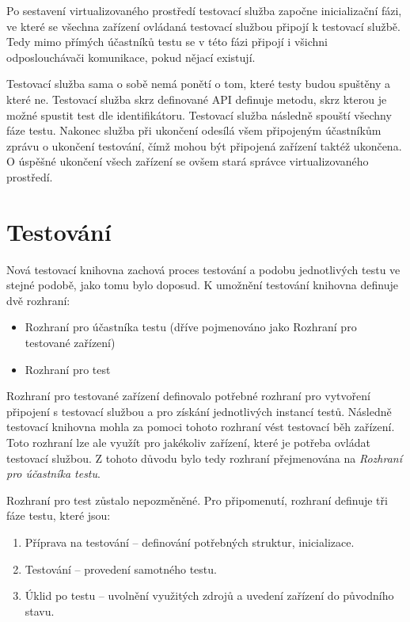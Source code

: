Po sestavení virtualizovaného prostředí testovací služba započne inicializační fázi, ve které se všechna zařízení ovládaná testovací službou připojí k testovací službě. Tedy mimo přímých účastníků testu se v této fázi připojí i všichni odposlouchávači komunikace, pokud nějací existují. 

Testovací služba sama o sobě nemá ponětí o tom, které testy budou spuštěny a které ne. Testovací služba skrz definované API definuje metodu, skrz kterou je možné spustit test dle identifikátoru. Testovací služba následně spouští všechny fáze testu. Nakonec služba při ukončení odesílá všem připojeným účastníkům zprávu o ukončení testování, čímž mohou být připojená zařízení taktéž ukončena. O úspěšné ukončení všech zařízení se ovšem stará správce virtualizovaného prostředí.


\section{Testování}

Nová testovací knihovna zachová proces testování a podobu jednotlivých testu ve stejné podobě, jako tomu bylo doposud. K umožnění testování knihovna definuje dvě rozhraní:

\begin{itemize}
    \item Rozhraní pro účastníka testu (dříve pojmenováno jako Rozhraní pro testované zařízení)
    \item Rozhraní pro test 
\end{itemize}

Rozhraní pro testované zařízení definovalo potřebné rozhraní pro vytvoření připojení s testovací službou a pro získání jednotlivých instancí testů. Následně testovací knihovna mohla za pomoci tohoto rozhraní vést testovací běh zařízení. Toto rozhraní lze ale využít pro jakékoliv zařízení, které je potřeba ovládat testovací službou. Z tohoto důvodu bylo tedy rozhraní přejmenována na \textit{Rozhraní pro účastníka testu}. 

Rozhraní pro test zůstalo nepozměněné. Pro připomenutí, rozhraní definuje tři fáze testu, které jsou:

\begin{enumerate}
    \item Příprava na testování -- definování potřebných struktur, inicializace.
    \item Testování -- provedení samotného testu.
    \item Úklid po testu -- uvolnění využitých zdrojů a uvedení zařízení do původního stavu.
\end{enumerate}

